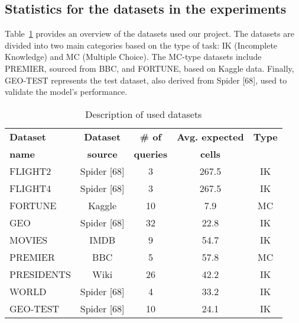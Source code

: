 \documentclass[12pt,a4paper]{article}
\begin{document}
\subsection{Statistics for the datasets in the experiments}
Table~\ref{tab:datasets} provides an overview of the datasets used our project. The datasets are divided into two main categories based on the type of task: IK (Incomplete Knowledge) and MC (Multiple Choice).
The MC-type datasets include PREMIER, sourced from BBC, and FORTUNE, based on Kaggle data.
Finally, GEO-TEST represents the test dataset, also derived from Spider [68], used to validate the model's performance.

\begin{table}[h]
\centering
\begin{tabular}{lcccc}
\toprule
\textbf{Dataset} & \textbf{Dataset} & \textbf{\# of} & \textbf{Avg. expected} & \textbf{Type} \\
\textbf{name} & \textbf{source} & \textbf{queries} & \textbf{cells} & \\
\midrule
FLIGHT2 & Spider [68] & 3 & 267.5 & IK \\
FLIGHT4 & Spider [68] & 3 & 267.5 & IK \\
FORTUNE & Kaggle & 10 & 7.9 & MC \\
GEO & Spider [68] & 32 & 22.8 & IK \\
MOVIES & IMDB & 9 & 54.7 & IK \\
PREMIER & BBC & 5 & 57.8 & MC \\
PRESIDENTS & Wiki & 26 & 42.2 & IK \\
WORLD & Spider [68] & 4 & 33.2 & IK \\



\midrule
GEO-TEST & Spider [68] & 10 & 24.1 & IK \\
\bottomrule
\end{tabular}
\caption{Description of used datasets}
\label{tab:datasets}
\end{table}
\end{document}
